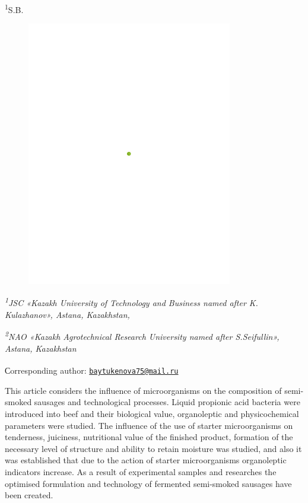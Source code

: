 \textsuperscript{1}S.B.
\begin{figure}[H]
	\centering
	\includegraphics[width=0.8\textwidth]{media/pish/image3}
	\caption*{}
\end{figure}


\emph{\textsuperscript{1}JSC «Kazakh University of Technology and
Business named after K. Kulazhanov», Astana, Kazakhstan,}

\emph{\textsuperscript{2}NAO «Kazakh Agrotechnical Research University
named after S.Seifullin», Astana, Kazakhstan}

{\bfseries \textsuperscript{\envelope }}Сorresponding author:
\href{mailto:baytukenova75@mail.ru}{\nolinkurl{baytukenova75@mail.ru}}

This article considers the influence of microorganisms on the
composition of semi-smoked sausages and technological processes. Liquid
propionic acid bacteria were introduced into beef and their biological
value, organoleptic and physicochemical parameters were studied. The
influence of the use of starter microorganisms on tenderness, juiciness,
nutritional value of the finished product, formation of the necessary
level of structure and ability to retain moisture was studied, and also
it was established that due to the action of starter microorganisms
organoleptic indicators increase. As a result of experimental samples
and researches the optimised formulation and technology of fermented
semi-smoked sausages have been created.

